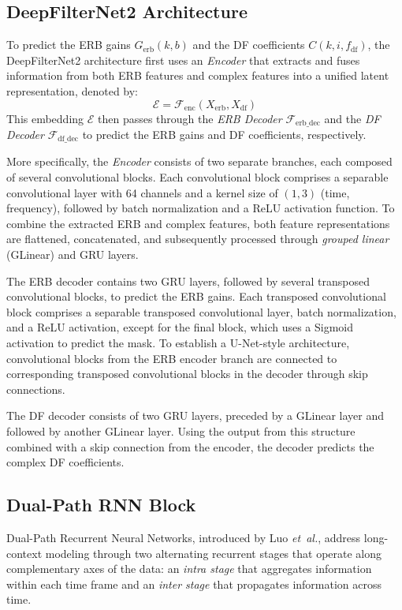 \documentclass[final,5p,times,authoryear]{elsarticle}
\newcommand{\etal}{\textit{et~al.}}
\begin{document}
\subsection{DeepFilterNet2 Architecture}
\label{sec:deepFilterNet_architecture}
To predict the ERB gains $G_{\mathrm{erb}}(k, b)$ and the DF coefficients $C(k, i, f_{\mathrm{df}})$, the DeepFilterNet2 architecture first uses an \textit{Encoder} that extracts and fuses information from both ERB features and complex features into a unified latent representation, denoted by:
\\
\begin{equation}
\mathcal{E} = \mathcal{F}_{\mathrm{enc}}\left(X_{\mathrm{erb}}, X_{\mathrm{df}}\right)
\end{equation}
This embedding $\mathcal{E}$ then passes through the \textit{ERB Decoder} $\mathcal{F}_{\mathrm{erb\_dec}}$ and the \textit{DF Decoder} $\mathcal{F}_{\mathrm{df\_dec}}$ to predict the ERB gains and DF coefficients, respectively.

More specifically, the \textit{Encoder} consists of two separate branches, each composed of several convolutional blocks. Each convolutional block comprises a separable convolutional layer with 64 channels and a kernel size of $(1, 3)$ (time, frequency), followed by batch normalization and a ReLU activation function. To combine the extracted ERB and complex features, both feature representations are flattened, concatenated, and subsequently processed through \textit{grouped linear} (GLinear) and GRU layers.

The ERB decoder contains two GRU layers, followed by several transposed convolutional blocks, to predict the ERB gains. Each transposed convolutional block comprises a separable transposed convolutional layer, batch normalization, and a ReLU activation, except for the final block, which uses a Sigmoid activation to predict the mask. To establish a U-Net-style architecture, convolutional blocks from the ERB encoder branch are connected to corresponding transposed convolutional blocks in the decoder through skip connections.

The DF decoder consists of two GRU layers, preceded by a GLinear layer and followed by another GLinear layer. Using the output from this structure combined with a skip connection from the encoder, the decoder predicts the complex DF coefficients.

\subsection{Dual-Path RNN Block}
\label{sec:dual_path_rnn_block}
Dual-Path Recurrent Neural Networks, introduced by Luo \etal \citep{DPRNN}, address long-context modeling through two alternating recurrent stages that operate along complementary axes of the data: an \textit{intra stage} that aggregates information within each time frame and an \textit{inter stage} that propagates information across time.
\end{document}
